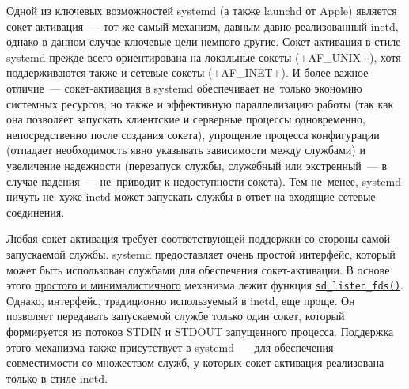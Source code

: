\documentclass[10pt,oneside,a4paper]{article}
\newcommand{\hreftt}[2]{\href{#1}{\texttt{#2}}}
\begin{document}
Одной из ключевых возможностей systemd (а также launchd от Apple) является
сокет-активация~--- тот же самый механизм, давным-давно реализованный inetd,
однако в данном случае ключевые цели немного другие. Сокет-активация в стиле
systemd прежде всего ориентирована на локальные сокеты (+AF_UNIX+), хотя
поддерживаются также и сетевые сокеты (+AF_INET+). И более важное отличие~---
сокет-активация в systemd обеспечивает не~только экономию системных ресурсов,
но также и эффективную параллелизацию работы (так как она позволяет запускать
клиентские и серверные процессы одновременно, непосредственно после создания
сокета), упрощение процесса конфигурации (отпадает необходимость явно указывать
зависимости между службами) и увеличение надежности (перезапуск службы,
служебный или экстренный~--- в случае падения~--- не~приводит к недоступности
сокета). Тем не~менее, systemd ничуть не~хуже inetd может запускать службы в
ответ на входящие сетевые соединения.

Любая сокет-активация требует соответствующей поддержки со стороны самой
запускаемой службы. systemd предоставляет очень простой интерфейс, который может
быть использован службами для обеспечения сокет-активации. В основе этого
\href{http://0pointer.de/blog/projects/socket-activation.html}{простого и
минималистичного} механизма лежит функция
\hreftt{http://www.freedesktop.org/software/systemd/man/sd_listen_fds.html}%
{sd\_listen\_fds()}.
Однако, интерфейс, традиционно используемый в inetd, еще проще. Он позволяет
передавать запускаемой службе только один сокет, который формируется из потоков
STDIN и STDOUT запущенного процесса. Поддержка этого механизма также
присутствует в systemd~--- для обеспечения совместимости со множеством служб,
у которых сокет-активация реализована только в стиле inetd.
\end{document}
